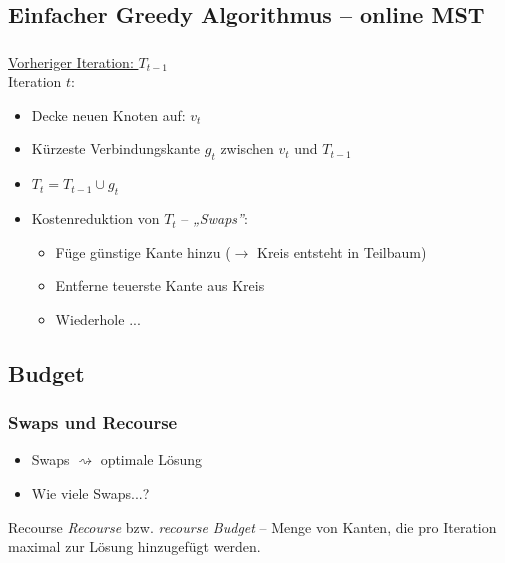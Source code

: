 \subsection{Einfacher Greedy Algorithmus -- online MST}

\begin{frame}
    \frametitle{\insertsubsection}
    \underline{Vorheriger Iteration: \qquad $T_{t-1}$}\\
    \vspace{1em}
    Iteration $t$:
    \begin{itemize}
        \itemsep\setlength{.8em}
        \item Decke neuen Knoten auf: $v_t$
        \item Kürzeste Verbindungskante $g_t$ zwischen $v_t$ und $T_{t-1}$
        \item $T_t = T_{t-1} \cup g_t$
        \vspace{1em}
        \item Kostenreduktion von $T_t$ -- \textit{„Swaps”}:
        \vspace{.8em}
        \begin{itemize}
        \itemsep\setlength{.8em}
            \item Füge günstige Kante hinzu ($\rightarrow$ Kreis entsteht in Teilbaum)
            \item Entferne teuerste Kante aus Kreis
            \item Wiederhole ...
        \end{itemize}
    \end{itemize}
\end{frame}

\subsection{Budget}

\begin{frame}
    \frametitle{Swaps und Recourse}
    \begin{itemize}
        \itemsep\setlength{1em}
        \item Swaps $\rightsquigarrow$ optimale Lösung
        \item Wie viele Swaps...?
    \end{itemize}
    \vspace{1em}
    \begin{block}{Recourse}
        \vspace{1em}
        \emph{Recourse} bzw. \emph{recourse Budget} -- Menge von Kanten, die pro Iteration maximal zur Lösung hinzugefügt werden.
        \vspace{1em}
    \end{block}
\end{frame}

